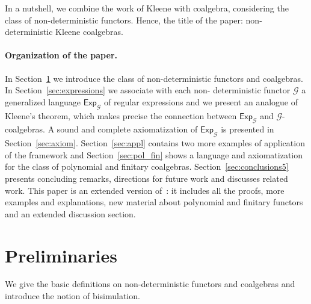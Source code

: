 \documentclass{LMCS}
\newcommand\Exp{\mathsf{Exp}}
\newcommand\G{\mathcal{G}}
\def\hyph{-\penalty0\hskip0pt\relax}
\theoremstyle{definition}
\theoremstyle{plain}
\theoremstyle{plain}
\theoremstyle{plain}
\theoremstyle{plain}
\theoremstyle{definition}
\theoremstyle{definition}
\begin{document}
In a nutshell, we combine the work of Kleene
with coalgebra, considering the class of non-deterministic functors.
Hence, the title of the paper: non-deterministic Kleene coalgebras.   

\paragraph{\textbf{Organization of the paper.}} In Section~\ref{sec:ndc} we
introduce the class of non\hyph deterministic functors and coalgebras. In
Section~\ref{sec:expressions} we associate with each non\hyph
deterministic functor $\G$ a generalized language $\Exp_\G$ of regular
expressions and we present an analogue of Kleene's theorem, which
makes precise the connection between $\Exp_\G$  and $\G$-coalgebras. A
sound and complete axiomatization  of $\Exp_\G$ is presented in
Section~\ref{sec:axiom}. Section~\ref{sec:appl} contains two more
examples of application of the framework and Section~\ref{sec:pol_fin} shows a language
and axiomatization for the class of polynomial and finitary
coalgebras. Section~\ref{sec:conclusions5} presents
concluding remarks, directions for future work and discusses related work. 
This paper is an extended version of~\cite{regexp,BRS09b}: it includes
all the proofs, more examples and explanations, new material about polynomial and finitary functors and an extended discussion section.

\section{Preliminaries} \label{sec:ndc}
We give the basic definitions on non-deterministic functors and coalgebras
and introduce the notion of bisimulation.
\end{document}
